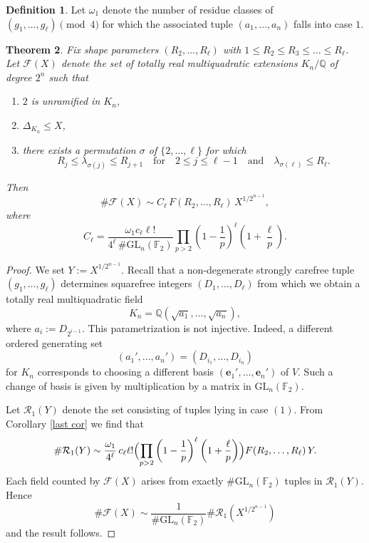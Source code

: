 \documentclass{amsart}
\theoremstyle{plain}
\newtheorem{theorem}{Theorem}[section]
\theoremstyle{definition}
\newtheorem{definition}[theorem]{Definition}
\theoremstyle{remark}
\numberwithin{equation}{section}
\begin{document}
\begin{definition}\label{defn of omega}
    Let $\omega_1$ denote the number of residue classes of
$(g_1,\dots,g_\ell)\pmod{4}$ for which the associated tuple
$(a_1,\dots,a_n)$ falls into case $1$.
\end{definition}

\begin{theorem}
Fix shape parameters $(R_2,\dots,R_\ell)$ with
$1\le R_2\le R_3\le \dots \le R_\ell$. Let $\mathcal{F}(X)$ denote the
set of totally real multiquadratic extensions $K_n/\mathbb{Q}$ of degree
$2^n$ such that
\begin{enumerate}
\item $2$ is unramified in $K_n$,
\item $\Delta_{K_n}\le X$,
\item there exists a permutation $\sigma$ of $\{2,\dots,\ell\}$ for which
\[
R_j\le \lambda_{\sigma(j)} \le R_{j+1} \quad \text{for} \quad 2\le j\le \ell-1 
\quad\text{and}\quad
\lambda_{\sigma(\ell)}\le R_\ell .
\]
\end{enumerate}
Then
\[
\#\mathcal{F}(X)\sim
C_\ell\,F(R_2,\dots,R_\ell)\,X^{1/2^{n-1}},
\]
where
\[
C_\ell=
\frac{\omega_1 c_\ell\ell !}{4^\ell\,\#\mathrm{GL}_n(\mathbb{F}_2)}
\prod_{p>2}
\left(1-\frac1p\right)^\ell
\left(1+\frac{\ell}{p}\right).
\]
\end{theorem}

\begin{proof}
We set $Y:=X^{1/2^{n-1}}$. Recall that a non-degenerate strongly carefree tuple $(g_1,\dots,g_\ell)$ determines squarefree integers $(D_1, \dots, D_\ell)$
from which we obtain a totally real multiquadratic field
\[
K_n=\mathbb{Q}(\sqrt{a_1},\dots,\sqrt{a_n}),
\]
where $a_i:=D_{2^{i-1}}$. This parametrization is not injective. Indeed, a different ordered generating set 
\[(a_1', \dots, a_n')=(D_{i_1}, \dots, D_{i_n})\]
for $K_n$ corresponds to choosing a different basis $(\mathbf e_1',\dots,\mathbf e_n')$
of $V$. Such a change of basis is given by multiplication by a matrix in $\mathrm{GL}_n(\mathbb{F}_2)$. 
\par Let $\mathcal{R}_1(Y)$ denote the set consisting
of tuples lying in case $(1)$. From Corollary \ref{last cor} we find that
\[
\#\mathcal{R}_1(Y)
\sim
\frac{\omega_1}{4^\ell}\,
c_\ell \ell!
\Bigl(\prod_{p>2}\left(1-\frac1p\right)^\ell
\left(1+\frac{\ell}{p}\right)\Bigr)
F(R_2,\dots,R_\ell)\,Y.
\]
\noindent Each field counted by $\mathcal{F}(X)$ arises from exactly
$\#\mathrm{GL}_n(\mathbb{F}_2)$ tuples in $\mathcal{R}_1(Y)$. Hence
\[
\#\mathcal{F}(X)
\sim
\frac{1}{\#\mathrm{GL}_n(\mathbb{F}_2)}
\#\mathcal{R}_1\!\left(X^{1/2^{n-1}}\right)
\]
and the result follows.
\end{proof}



\end{document}
